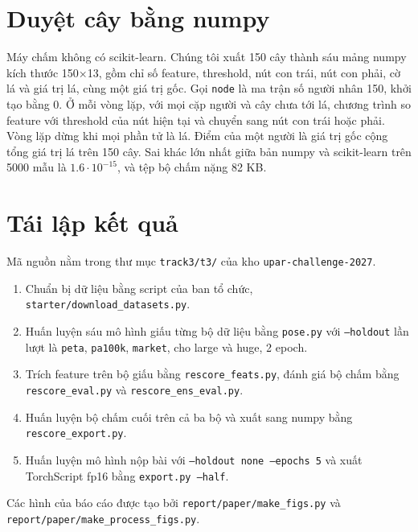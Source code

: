 \documentclass[11pt,a4paper]{article}
\begin{document}
\section{Duyệt cây bằng numpy}
\label{app:trees}

Máy chấm không có scikit-learn. Chúng tôi xuất 150 cây thành sáu mảng numpy kích thước 150×13, gồm chỉ số feature, threshold, nút con trái, nút con phải, cờ lá và giá trị lá, cùng một giá trị gốc. Gọi \texttt{node} là ma trận số người nhân 150, khởi tạo bằng 0. Ở mỗi vòng lặp, với mọi cặp người và cây chưa tới lá, chương trình so feature với threshold của nút hiện tại và chuyển sang nút con trái hoặc phải. Vòng lặp dừng khi mọi phần tử là lá. Điểm của một người là giá trị gốc cộng tổng giá trị lá trên 150 cây. Sai khác lớn nhất giữa bản numpy và scikit-learn trên 5000 mẫu là $1.6\cdot10^{-15}$, và tệp bộ chấm nặng 82 KB.

\section{Tái lập kết quả}

Mã nguồn nằm trong thư mục \texttt{track3/t3/} của kho \texttt{upar-challenge-2027}.

\begin{enumerate}[leftmargin=1.6em]
\item Chuẩn bị dữ liệu bằng script của ban tổ chức, \texttt{starter/download\_datasets.py}.
\item Huấn luyện sáu mô hình giấu từng bộ dữ liệu bằng \texttt{pose.py} với \texttt{--holdout} lần lượt là \texttt{peta}, \texttt{pa100k}, \texttt{market}, cho large và huge, 2 epoch.
\item Trích feature trên bộ giấu bằng \texttt{rescore\_feats.py}, đánh giá bộ chấm bằng \texttt{rescore\_eval.py} và \texttt{rescore\_ens\_eval.py}.
\item Huấn luyện bộ chấm cuối trên cả ba bộ và xuất sang numpy bằng \texttt{rescore\_export.py}.
\item Huấn luyện mô hình nộp bài với \texttt{--holdout none --epochs 5} và xuất TorchScript fp16 bằng \texttt{export.py --half}.
\end{enumerate}

Các hình của báo cáo được tạo bởi \texttt{report/paper/make\_figs.py} và \texttt{report/paper/make\_process\_figs.py}.
\end{document}

